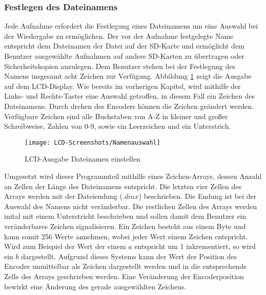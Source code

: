 \subsubsection{Festlegen des Dateinamens}
Jede Aufnahme erfordert die Festlegung eines Dateinamens um eine Auswahl bei der Wiedergabe zu ermöglichen. Der vor der Aufnahme festgelegte Name entspricht dem Dateinamen der Datei auf der SD-Karte und ermöglicht dem Benutzer ausgewählte Aufnahmen auf andere SD-Karten zu übertragen oder Sicherheitskopien anzulegen. Dem Benutzer stehen bei der Festlegung des Namens insgesamt acht Zeichen zur Verfügung. Abbildung \ref{lcd:filename} zeigt die Ausgabe auf dem LCD-Display. Wie bereits im vorherigen Kapitel, wird mithilfe der Links- und Rechts-Taster eine Auswahl getroffen, in diesem Fall ein Zeichen des Dateinamens. Durch drehen des Encoders können die Zeichen geändert werden. Verfügbare Zeichen sind alle Buchstaben von A-Z in kleiner und großer Schreibweise, Zahlen von 0-9, sowie ein Leerzeichen und ein Unterstrich.
\begin{figure}[h]
	\begin{center}
		\texttt{[image: LCD-Screenshots/Namenauswahl]}
		\caption{LCD-Ausgabe Dateinamen einstellen}
		\label{lcd:filename}
	\end{center}
\end{figure}
Umgesetzt wird dieser Programmteil mithilfe eines Zeichen-Arrays, dessen Anzahl an Zellen der Länge des Dateinamens entspricht. Die letzten vier Zellen des Arrays werden mit der Dateiendung ($.dmx$) beschrieben. Die Endung ist bei der Auswahl des Namens nicht veränderbar. Die restlichen Zellen des Arrays werden inital mit einem Unterstricht beschrieben und sollen damit dem Benutzer ein veränderbares Zeichen signalisieren. Ein Zeichen besteht aus einem Byte und kann somit 256 Werte annehmen, wobei jeder Wert einem Zeichen entspricht. Wird zum Beispiel der Wert der einem $a$ entspricht um 1 inkrementiert, so wird ein $b$ dargestellt. Aufgrund dieses Systems kann der Wert der Position des Encoder unmittelbar als Zeichen dargestellt werden und in die entsprechende Zelle des Arrays geschrieben werden. Eine Veränderung der Encoderposition bewirkt eine Änderung des gerade ausgewählten Zeichens.

